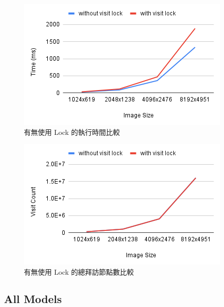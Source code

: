 \documentclass[sigconf,nonacm]{acmart}
\begin{document}
\begin{figure}
  \centering
  \includegraphics[width=\linewidth]{"./image/openmp_visit_lock.png"}
  \caption{有無使用 Lock 的執行時間比較}
  \label{fig:openmp_visit_lock}
\end{figure}

\begin{figure}
  \centering
  \includegraphics[width=\linewidth]{"./image/openmp_visit_count.png"}
  \caption{有無使用 Lock 的總拜訪節點數比較}
  \label{fig:openmp_visit_count}
\end{figure}

\subsection{All Models}
\end{document}
